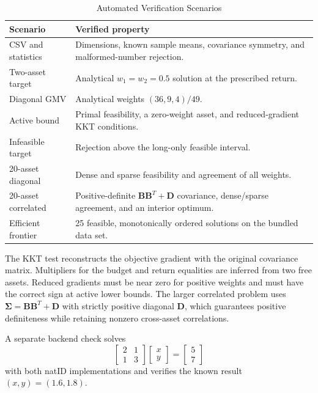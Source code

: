 \documentclass[conference]{IEEEtran}
\newcommand{\mat}[1]{\boldsymbol{#1}}
\begin{document}
\begin{table}[!t]
\caption{Automated Verification Scenarios}
\label{tab:tests}
\centering
\scriptsize
\begin{tabular}{p{}p{}}
\toprule
Scenario & Verified property\\
\midrule
CSV and statistics & Dimensions, known sample means, covariance symmetry,
and malformed-number rejection.\\
Two-asset target & Analytical $w_1=w_2=0.5$ solution at the prescribed
return.\\
Diagonal GMV & Analytical weights $(36,9,4)/49$.\\
Active bound & Primal feasibility, a zero-weight asset, and reduced-gradient
KKT conditions.\\
Infeasible target & Rejection above the long-only feasible interval.\\
20-asset diagonal & Dense and sparse feasibility and agreement of all
weights.\\
20-asset correlated & Positive-definite $\mat{B}\mat{B}^{T}+\mat{D}$
covariance, dense/sparse agreement, and an interior optimum.\\
Efficient frontier & 25 feasible, monotonically ordered solutions on the
bundled data set.\\
\bottomrule
\end{tabular}
\end{table}

The KKT test reconstructs the objective gradient with the original covariance
matrix. Multipliers for the budget and return equalities are inferred from two
free assets. Reduced gradients must be near zero for positive weights and must
have the correct sign at active lower bounds. The larger correlated problem
uses $\mat{\Sigma}=\mat{B}\mat{B}^{T}+\mat{D}$ with strictly positive diagonal
$\mat{D}$, which guarantees positive definiteness while retaining nonzero
cross-asset correlations.

A separate backend check solves
\begin{equation}
 \begin{bmatrix}2&1\\1&3\end{bmatrix}
 \begin{bmatrix}x\\y\end{bmatrix}=
 \begin{bmatrix}5\\7\end{bmatrix}
 \label{eq:backend-check}
\end{equation}
with both natID implementations and verifies the known result
$(x,y)=(1.6,1.8)$.
\end{document}

